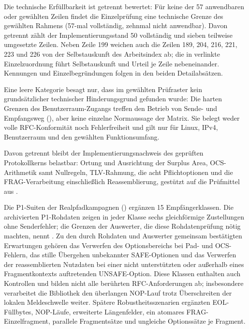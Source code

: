 Die technische Erfüllbarkeit ist getrennt bewertet: Für keine der 57 anwendbaren oder gewählten Zeilen
findet die Einzelprüfung eine technische Grenze des gewählten Rahmens (57-mal vollständig, zehnmal nicht
anwendbar). Davon getrennt zählt der Implementierungs\-stand 50 vollständig und sieben teilweise umgesetzte
Zeilen.
Neben Zeile 199 weichen auch die Zeilen 189, 204, 216, 221, 223 und 226 von der Selbstauskunft
des Arbeitsindex ab; die in  verlinkte Einzelzuordnung führt
Selbstauskunft und Urteil je Zeile nebeneinander. Kennungen und Einzelbegründungen folgen in den beiden
Detailabsätzen.

Eine leere Kategorie  besagt nur, dass im gewählten Prüfraster kein grundsätzlicher
technischer Hinderungsgrund gefunden wurde: Die harten Grenzen des Benutzerraum-Zugangs treffen den
Betrieb von Sende- und Empfangsweg (), aber keine einzelne Normaussage der
Matrix. Sie belegt weder volle
RFC-Konformität noch Fehlerfreiheit und gilt nur für Linux, IPv4, Benutzerraum und den gewählten
Funktionsumfang.

Davon getrennt bleibt der Implementierungsnachweis des geprüften Protokollkerns belastbar: Ortung und
Ausrichtung der Surplus Area, OCS-Arithmetik samt Nullregeln, TLV-Rahmung, die acht Pflichtoptionen
und die FRAG-Verarbeitung einschließlich Reassemblierung, gestützt auf die Prüfmittel aus
.

Die P1-Suiten der Realpfadkampagnen () ergänzen 15 Empfängerklassen. Die archivierten
P1-Rohdaten zeigen in jeder Klasse sechs gleichförmige Zustellungen ohne Senderfehler; die Grenzen der
Auswerter, die diese Rohdaten\-prüfung nötig machten, nennt . Zu den durch
Rohdaten und Auswerter gemeinsam bestätigten Erwartungen gehören das Verwerfen des
Optionsbereichs bei Pad- und OCS-Fehlern, das stille Übergehen unbekannter SAFE-Optionen und das
Verwerfen der reassemblierten Nutzdaten bei einer nicht unterstützten oder außerhalb eines
Fragmentkontexts auftretenden UNSAFE-Option. Diese Klassen enthalten auch Kontrollen und bilden nicht alle
berührten RFC-Anforderungen ab; insbesondere verarbeitet die Bibliothek den überlangen NOP-Lauf trotz Überschreiten
der lokalen Meldeschwelle weiter. Spätere Robustheitsszenarien ergänzten EOL-Füllbytes, NOP-Läufe, erweiterte
Längenfelder, ein atomares FRAG-Einzelfragment, parallele Fragmentsätze und ungleiche Options\-sätze je
Fragment.

